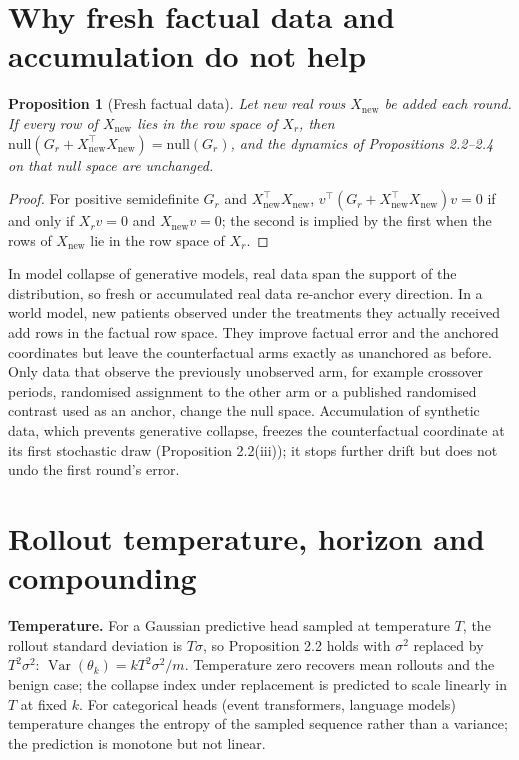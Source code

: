 \documentclass[11pt,a4paper]{article}
\newcommand{\Var}{\operatorname{Var}}
\newtheorem{proposition}{Proposition}[section]
\begin{document}
\section{Why fresh factual data and accumulation do not help}
\begin{proposition}[Fresh factual data]
Let new real rows $X_{\mathrm{new}}$ be added each round. If every row of $X_{\mathrm{new}}$ lies in the row space of $X_r$, then $\mathrm{null}(G_r+X_{\mathrm{new}}^\top X_{\mathrm{new}})=\mathrm{null}(G_r)$, and the dynamics of Propositions 2.2--2.4 on that null space are unchanged.
\end{proposition}
\begin{proof}
For positive semidefinite $G_r$ and $X_{\mathrm{new}}^\top X_{\mathrm{new}}$, $v^\top(G_r+X_{\mathrm{new}}^\top X_{\mathrm{new}})v=0$ if and only if $X_rv=0$ and $X_{\mathrm{new}}v=0$; the second is implied by the first when the rows of $X_{\mathrm{new}}$ lie in the row space of $X_r$.
\end{proof}
In model collapse of generative models, real data span the support of the distribution, so fresh or accumulated real data re-anchor every direction\cite{shumailov2024,gerstgrasser2024}. In a world model, new patients observed under the treatments they actually received add rows in the factual row space. They improve factual error and the anchored coordinates but leave the counterfactual arms exactly as unanchored as before. Only data that observe the previously unobserved arm, for example crossover periods, randomised assignment to the other arm or a published randomised contrast used as an anchor, change the null space. Accumulation of synthetic data, which prevents generative collapse, freezes the counterfactual coordinate at its first stochastic draw (Proposition 2.2(iii)); it stops further drift but does not undo the first round's error.

\section{Rollout temperature, horizon and compounding}
\textbf{Temperature.} For a Gaussian predictive head sampled at temperature $T$, the rollout standard deviation is $T\sigma$, so Proposition 2.2 holds with $\sigma^2$ replaced by $T^2\sigma^2$: $\Var(\theta_k)=kT^2\sigma^2/m$. Temperature zero recovers mean rollouts and the benign case; the collapse index under replacement is predicted to scale linearly in $T$ at fixed $k$. For categorical heads (event transformers, language models) temperature changes the entropy of the sampled sequence rather than a variance; the prediction is monotone but not linear.
\end{document}
